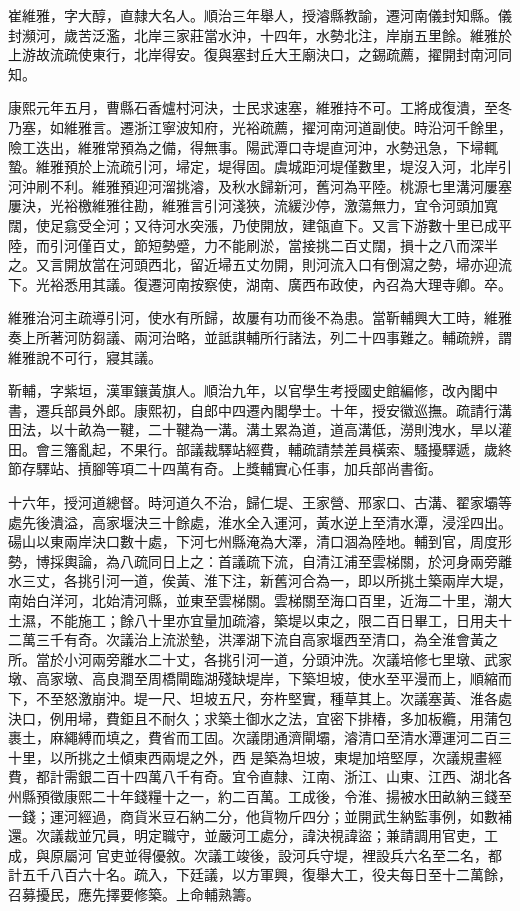 \begin{pinyinscope}
崔維雅，字大醇，直隸大名人。順治三年舉人，授濬縣教諭，遷河南儀封知縣。儀封瀕河，歲苦泛濫，北岸三家莊當水沖，十四年，水勢北注，岸崩五里餘。維雅於上游故流疏使東行，北岸得安。復與塞封丘大王廟決口，之錫疏薦，擢開封南河同知。

康熙元年五月，曹縣石香爐村河決，士民求速塞，維雅持不可。工將成復潰，至冬乃塞，如維雅言。遷浙江寧波知府，光裕疏薦，擢河南河道副使。時沿河千餘里，險工迭出，維雅常預為之備，得無事。陽武潭口寺堤直河沖，水勢迅急，下埽輒蟄。維雅預於上流疏引河，埽定，堤得固。虞城距河堤僅數里，堤沒入河，北岸引河沖刷不利。維雅預迎河溜挑濬，及秋水歸新河，舊河為平陸。桃源七里溝河屢塞屢決，光裕檄維雅往勘，維雅言引河淺狹，流緩沙停，激蕩無力，宜令河頭加寬闊，使足翕受全河；又待河水突漲，乃使開放，建瓴直下。又言下游數十里已成平陸，而引河僅百丈，節短勢蹙，力不能刷淤，當接挑二百丈闊，損十之八而深半之。又言開放當在河頭西北，留近埽五丈勿開，則河流入口有倒瀉之勢，埽亦迎流下。光裕悉用其議。復遷河南按察使，湖南、廣西布政使，內召為大理寺卿。卒。

維雅治河主疏導引河，使水有所歸，故屢有功而後不為患。當靳輔興大工時，維雅奏上所著河防芻議、兩河治略，並詆諆輔所行諸法，列二十四事難之。輔疏辨，謂維雅說不可行，寢其議。

靳輔，字紫垣，漢軍鑲黃旗人。順治九年，以官學生考授國史館編修，改內閣中書，遷兵部員外郎。康熙初，自郎中四遷內閣學士。十年，授安徽巡撫。疏請行溝田法，以十畝為一鞬，二十鞬為一溝。溝土累為道，道高溝低，澇則洩水，旱以灌田。會三籓亂起，不果行。部議裁驛站經費，輔疏請禁差員橫索、騷擾驛遞，歲終節存驛站、摃腳等項二十四萬有奇。上獎輔實心任事，加兵部尚書銜。

十六年，授河道總督。時河道久不治，歸仁堤、王家營、邢家口、古溝、翟家壩等處先後潰溢，高家堰決三十餘處，淮水全入運河，黃水逆上至清水潭，浸淫四出。碭山以東兩岸決口數十處，下河七州縣淹為大澤，清口涸為陸地。輔到官，周度形勢，博採輿論，為八疏同日上之：首議疏下流，自清江浦至雲梯關，於河身兩旁離水三丈，各挑引河一道，俟黃、淮下注，新舊河合為一，即以所挑土築兩岸大堤，南始白洋河，北始清河縣，並東至雲梯關。雲梯關至海口百里，近海二十里，潮大土濕，不能施工；餘八十里亦宜量加疏濬，築堤以束之，限二百日畢工，日用夫十二萬三千有奇。次議治上流淤墊，洪澤湖下流自高家堰西至清口，為全淮會黃之所。當於小河兩旁離水二十丈，各挑引河一道，分頭沖洗。次議培修七里墩、武家墩、高家墩、高良澗至周橋閘臨湖殘缺堤岸，下築坦坡，使水至平漫而上，順縮而下，不至怒激崩沖。堤一尺、坦坡五尺，夯杵堅實，種草其上。次議塞黃、淮各處決口，例用埽，費鉅且不耐久；求築土御水之法，宜密下排椿，多加板纜，用蒲包裹土，麻繩縛而填之，費省而工固。次議閉通濟閘壩，濬清口至清水潭運河二百三十里，以所挑之土傾東西兩堤之外，西是築為坦坡，東堤加培堅厚，次議規畫經費，都計需銀二百十四萬八千有奇。宜令直隸、江南、浙江、山東、江西、湖北各州縣預徵康熙二十年錢糧十之一，約二百萬。工成後，令淮、揚被水田畝納三錢至一錢；運河經過，商貨米豆石納二分，他貨物斤四分；並開武生納監事例，如數補還。次議裁並冗員，明定職守，並嚴河工處分，諱決視諱盜；兼請調用官吏，工成，與原屬河官吏並得優敘。次議工竣後，設河兵守堤，裡設兵六名至二名，都計五千八百六十名。疏入，下廷議，以方軍興，復舉大工，役夫每日至十二萬餘，召募擾民，應先擇要修築。上命輔熟籌。


\end{pinyinscope}
